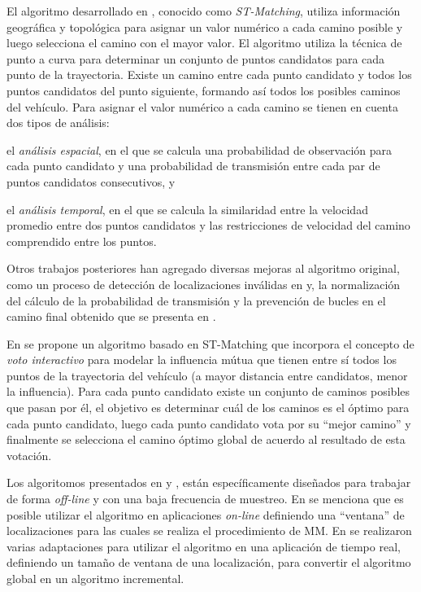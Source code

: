 El algoritmo desarrollado en \citep{lou2009map}, conocido como \emph{ST-Matching}, utiliza información geográfica y topológica para asignar un valor numérico a cada camino posible y luego selecciona el camino con el mayor valor. El algoritmo utiliza la técnica de punto a curva para determinar un conjunto de puntos candidatos para cada punto de la trayectoria. Existe un camino entre cada punto candidato y todos los puntos candidatos del punto siguiente, formando así todos los posibles caminos del vehículo. Para asignar el valor numérico a cada camino se tienen en cuenta dos tipos de análisis: \begin{enumerate*}[a)] \item el \emph{análisis espacial}, en el que se calcula una probabilidad de observación para cada punto candidato y una probabilidad de transmisión entre cada par de puntos candidatos consecutivos, y \item el \emph{análisis temporal}, en el que se calcula la similaridad entre la velocidad promedio entre dos puntos candidatos y las restricciones de velocidad del camino comprendido entre los puntos.\end{enumerate*} Otros trabajos posteriores han agregado diversas mejoras al algoritmo original, como un proceso de detección de localizaciones inválidas en  \citep{sakic2012map} y, la normalización del cálculo de la probabilidad de transmisión y la prevención de bucles en el camino final obtenido que se presenta en  \citep{budigm2012algorithm}.

En \citep{yuan2010interactive} se propone un algoritmo basado en ST-Matching que incorpora el concepto de \emph{voto interactivo} para modelar la influencia mútua que tienen entre sí todos los puntos de la trayectoria del vehículo (a mayor distancia entre candidatos, menor la influencia). Para cada punto candidato existe un conjunto de caminos posibles que pasan por él, el objetivo es determinar cuál de los caminos es el óptimo para cada punto candidato, luego cada punto candidato vota por su “mejor camino” y finalmente se selecciona el camino óptimo global de acuerdo al resultado de esta votación.

Los algoritomos presentados en \citep{lou2009map} y \citep{yuan2010interactive}, están específicamente diseñados para trabajar de forma \emph{off-line} y con una baja frecuencia de muestreo. En \citep{lou2009map} se  menciona que es posible utilizar el algoritmo en aplicaciones \emph{on-line} definiendo una “ventana” de localizaciones para las cuales se realiza el procedimiento de MM. En \citep{sakic2012map} se realizaron varias adaptaciones para utilizar el algoritmo en una aplicación de tiempo real, definiendo un tamaño de ventana de una localización, para convertir el algoritmo global en un algoritmo incremental.

